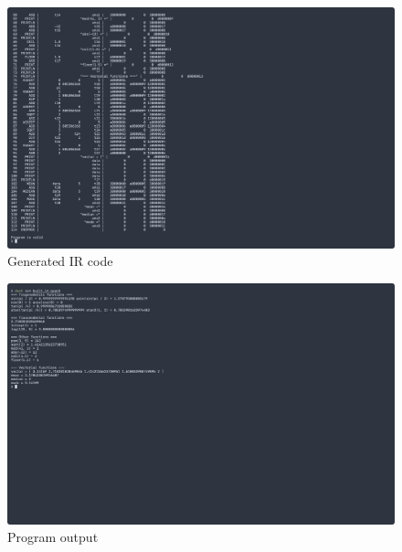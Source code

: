 \begin{figure}[H]
    \centering
    \caption{Generated IR code}
    \includegraphics[width=\textwidth]{evidences/built_in_ir}
\end{figure}

\begin{figure}[H]
    \centering
    \caption{Program output}
    \includegraphics[width=\textwidth]{evidences/built_in_output}
\end{figure}

\newpage
